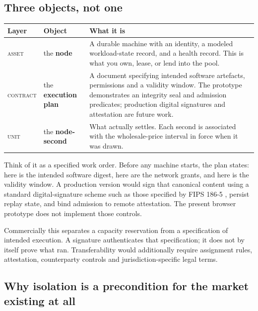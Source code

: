 \documentclass[11pt,letterpaper]{article}
\begin{document}
\subsection{Three objects, not one}

\begin{center}
\renewcommand{\arraystretch}{1.5}
\begin{tabular}{@{}p{} p{} p{}@{}}
\toprule
\textbf{Layer} & \textbf{Object} & \textbf{What it is} \\
\midrule
\textsc{asset} & the \textbf{node} &
A durable machine with an identity, a modeled workload-state record, and a
health record. This is what you own, lease, or lend into the pool.\\
\textsc{contract} & the \textbf{execution plan} &
A document specifying intended software artefacts, permissions and a validity
window. The prototype demonstrates an integrity seal and admission predicates;
production digital signatures and attestation are future work.\\
\textsc{unit} & the \textbf{node-second} &
What actually settles. Each second is associated with the wholesale-price
interval in force when it was drawn.\\
\bottomrule
\end{tabular}
\end{center}

\begin{plainbox}
Think of it as a specified work order. Before any machine starts, the plan
states: here is the intended software digest, here are the network grants, and
here is the validity window. A production version would sign that canonical
content using a standard digital-signature scheme such as those specified by
FIPS 186-5 \cite{fips1865}, persist replay state, and bind admission to remote
attestation. The present browser prototype does not implement those controls.

\vspace{4pt}
Commercially this separates a capacity reservation from a specification of
intended execution. A signature authenticates that specification; it does not
by itself prove what ran. Transferability would additionally require assignment
rules, attestation, counterparty controls and jurisdiction-specific legal terms.
\end{plainbox}

\subsection{Why isolation is a precondition for the market existing at all}
\end{document}
